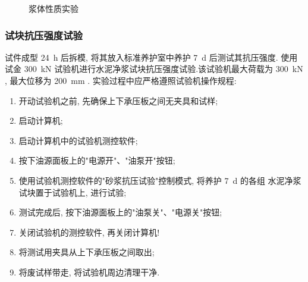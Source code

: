 \begin{figure}
  \centering
  \quad
  \caption{浆体性质实验}
\end{figure}

\subsubsection{试块抗压强度试验}
试件成型 \SI{24}{\hour} 后拆模, 将其放入标准养护室中养护 \SI{7}{\day} 后测试其抗压强度.
使用试金 \SI{300}{\kilo\newton} 试验机进行水泥净浆试块抗压强度试验.该试验机最大荷载为 \SI{300}{\kilo\newton} , 最大位移为 \SI{200}{\milli\meter} .
实验过程中应严格遵照试验机操作规程:
\begin{enumerate}[wide, labelwidth=!, labelindent=0pt]
  \item 开动试验机之前, 先确保上下承压板之间无夹具和试样;
  \item 启动计算机;
  \item 启动计算机中的试验机测控软件;
  \item 按下油源面板上的"电源开"、"油泵开"按钮;
  \item 使用试验机测控软件的"砂浆抗压试验"控制模式, 将养护 \SI{7}{\day} 的各组  水泥净浆试块置于试验机上, 进行试验;
  \item 测试完成后, 按下油源面板上的"油泵关"、"电源关"按钮;
  \item 关闭试验机的测控软件, 再关闭计算机!
  \item 将测试用夹具从上下承压板之间取出;
  \item 将废试样带走, 将试验机周边清理干净.
\end{enumerate}

